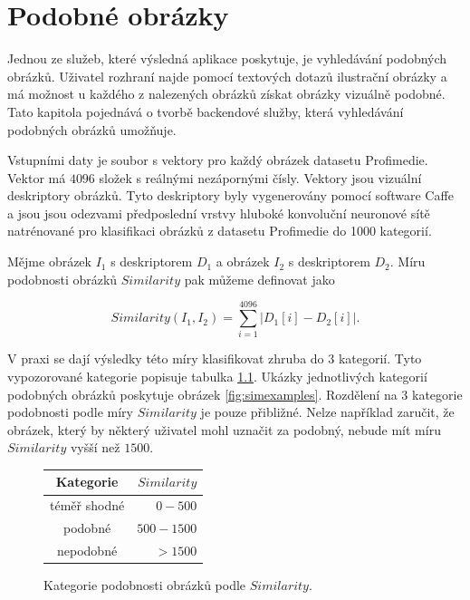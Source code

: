 \chapter{Podobné obrázky}
\label{chap:similar}


Jednou ze služeb, které výsledná aplikace poskytuje, je vyhledávání podobných obrázků. Uživatel rozhraní najde pomocí textových dotazů ilustrační obrázky a má možnost u každého z nalezených obrázků získat obrázky vizuálně podobné. Tato kapitola pojednává o tvorbě backendové služby, která vyhledávání podobných obrázků umožňuje.

Vstupními daty je soubor s vektory pro každý obrázek datasetu Profimedie. Vektor má $4 096$ složek s reálnými nezápornými čísly. Vektory jsou vizuální deskriptory obrázků. Tyto deskriptory byly vygenerovány pomocí software Caffe\cite{caffe} a jsou jsou odezvami předposlední vrstvy hluboké konvoluční neuronové sítě natrénované pro klasifikaci obrázků z datasetu Profimedie do 1000 kategorií.

Mějme obrázek $I_1$ s deskriptorem $D_1$ a obrázek $I_2$ s deskriptorem $D_2$. Míru podobnosti obrázků $Similarity$ pak můžeme definovat jako

\begin{equation}
  Similarity(I_1, I_2) = \sum_{i=1}^{4096} |D_1[i]-D_2[i]|.
\end{equation}

V praxi se dají výsledky této míry klasifikovat zhruba do 3 kategorií. Tyto vypozorované kategorie popisuje tabulka \ref{fig:simtypes}. Ukázky jednotlivých kategorií podobných obrázků poskytuje obrázek \ref{fig:simexamples}. Rozdělení na 3 kategorie podobnosti podle míry $Similarity$ je pouze přibližné. Nelze například zaručit, že obrázek, který by některý uživatel mohl uznačit za podobný, nebude mít míru $Similarity$ vyšší než $1 500$.

\begin{figure}[h]
\label{fig:simtypes}
\centering
\begin{tabular}{ | c | r |}
  \hline
     Kategorie & $Similarity$\\
  \hline
  \hline
    téměř shodné & $0 - 500$ \\
  \hline
    podobné & $500 - 1500$ \\
  \hline
    nepodobné & $> 1500$ \\
\hline
\end{tabular}

  \caption{Kategorie podobnosti obrázků podle $Similarity$.}
\end{figure}

